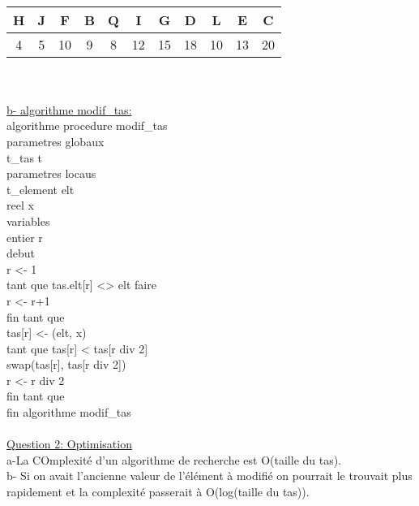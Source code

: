\documentclass [11pt]{report}
\begin{document}
\vspace{2mm}\\
\begin{tabular}{|c|c|c|c|c|c|c|c|c|c|c|}
\hline H & J & F  & B & Q & I  & G  &  D & L  & E  & C \\ 
\hline 4 & 5 & 10 & 9 & 8 & 12 & 15 & 18 & 10 & 13 & 20 \\ 
\hline 
\end{tabular} \\
\vspace{5mm}\\
\indent \underline{ b- algorithme modif\_tas:}\\
\indent algorithme procedure modif\_tas\\
\indent \indent parametres globaux\\
\indent \indent \indent t\_tas t\\
\indent \indent parametres locaus\\
\indent \indent \indent t\_element elt\\
\indent \indent \indent reel x\\
\indent \indent variables\\
\indent \indent \indent entier r\\
\indent debut\\
\indent \indent r <- 1\\
\indent \indent tant que tas.elt[r] <> elt faire\\
\indent \indent \indent r <- r+1\\
\indent \indent fin tant que\\
\indent \indent tas[r] <- (elt, x)\\
\indent \indent tant que tas[r] < tas[r div 2]\\
\indent \indent \indent swap(tas[r], tas[r div 2])\\
\indent \indent \indent r <- r div 2\\
\indent \indent fin tant que\\
\indent fin algorithme modif\_tas\\
\vspace{5mm}\\
\underline{Question 2: Optimisation}\\
\indent a-La COmplexit\'e d'un algorithme de recherche est O(taille du tas).\\
\indent b- Si on avait l'ancienne valeur de l'\'el\'ement \`a modifi\'e on pourrait le trouvait plus rapidement et la complexit\'e passerait \`a O(log(taille du tas)).
\end{document}
